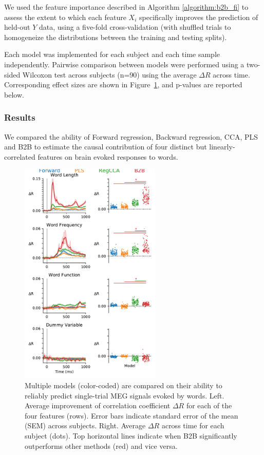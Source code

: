 We used the feature importance described in Algorithm \ref{algorithm:b2b_fi} to
assess the extent to which each feature $X_i$ specifically improves the
prediction of held-out $Y$ data, using a five-fold cross-validation (with shuffled
trials to homogeneize the distributions between the training and testing
splits).

Each model was implemented for each subject and each time sample independently.
Pairwise comparison between models were performed using a two-sided Wilcoxon
test across subjects (n=90) using the average $\Delta R$ across time.
Corresponding effect sizes are shown in Figure~\ref{fig:meg_results}, and
p-values are reported below.


\subsubsection{Results}
We compared the ability of Forward regression, Backward regression, CCA, PLS and
B2B to estimate the causal contribution of four distinct but linearly-correlated features
on brain evoked responses to words.

\begin{figure}
  \begin{center}
    \includegraphics[width=0.6\textwidth, trim=0cm 0cm 0cm 0cm, clip=True]{figures/meg.pdf}
  \end{center}
  \caption{Multiple models (color-coded) are compared on their ability to
  reliably predict single-trial MEG signals evoked by words. Left. Average
  improvement of correlation coefficient $\Delta R$ for each of the four
  features (rows). Error bars indicate standard error of the mean (SEM) across
  subjects. Right. Average $\Delta R$ across time for each subject (dots). Top
  horizontal lines indicate when B2B significantly outperforms other methods
  (red) and vice versa. \label{fig:meg_results}
}
\end{figure}

